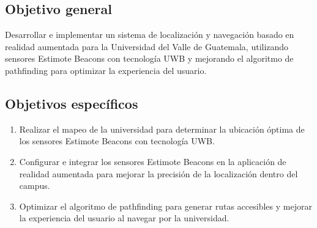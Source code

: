 \documentclass{article}
\begin{document}
\subsection{Objetivo general}
{\justify Desarrollar e implementar un sistema de localización y navegación basado en realidad aumentada para la Universidad 
del Valle de Guatemala, utilizando sensores Estimote Beacons con tecnología UWB y mejorando el algoritmo de pathfinding para 
optimizar la experiencia del usuario.}

\subsection{Objetivos específicos}
\begin{enumerate}[label=\thesubsection.\arabic*]
    \item Realizar el mapeo de la universidad para determinar la ubicación óptima de los sensores Estimote Beacons con tecnología UWB.
    \item Configurar e integrar los sensores Estimote Beacons en la aplicación de realidad aumentada para mejorar la precisión de la 
    localización dentro del campus.
    \item Optimizar el algoritmo de pathfinding para generar rutas accesibles y mejorar la experiencia del usuario al navegar por la 
    universidad.
\end{enumerate}

\newpage
\end{document}
